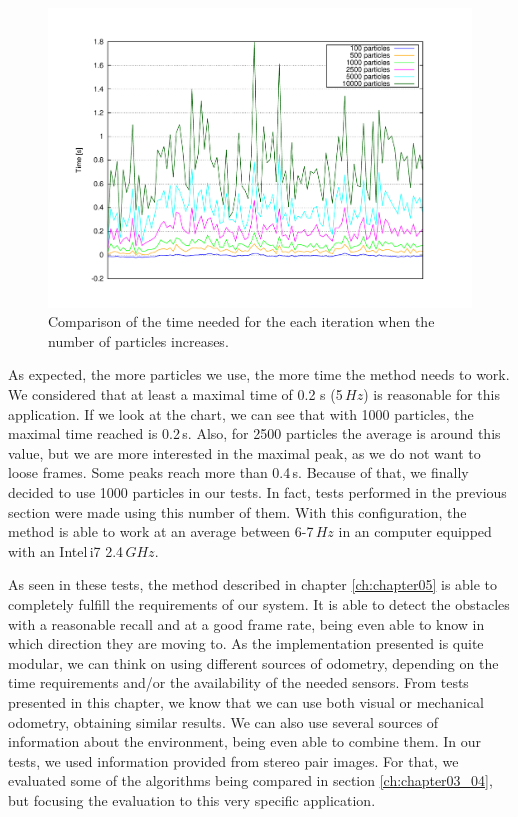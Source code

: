 \begin{figure}[t]
  \centering
  \includegraphics[width=\textwidth,height=0.5\textwidth,trim=50 50 90 60, clip]{timesVsParticles}
  \caption{Comparison of the time needed for the each iteration when the number of particles increases.}\label{fig:cp05_time_vs_particles}
\end{figure}

As expected, the more particles we use, the more time the method needs to work. We considered that at least a maximal time of 0.2 s (5\,$Hz$) is reasonable for this application. If we look at the chart, we can see that with 1000 particles, the maximal time reached is 0.2\,s. Also, for 2500 particles the average is around this value, but we are more interested in the maximal peak, as we do not want to loose frames. Some peaks reach more than 0.4\,s. Because of that, we finally decided to use 1000 particles in our tests. In fact, tests performed in the previous section were made using this number of them. With this configuration, the method is able to work at an average between 6-7\,$Hz$ in an computer equipped with an Intel\textregistered\,i7 2.4\,$GHz$.

As seen in these tests, the method described in chapter \ref{ch:chapter05} is able to completely fulfill the requirements of our system. It is able to detect the obstacles with a reasonable recall and at a good frame rate, being even able to know in which direction they are moving to. As the implementation presented is quite modular, we can think on using different sources of odometry, depending on the time requirements and/or the availability of the needed sensors. From tests presented in this chapter, we know that we can use both visual or mechanical odometry, obtaining similar results. We can also use several sources of information about the environment, being even able to combine them. In our tests, we used information provided from stereo pair images. For that, we evaluated some of the algorithms being compared in section \ref{ch:chapter03_04}, but focusing the evaluation to this very specific application.

